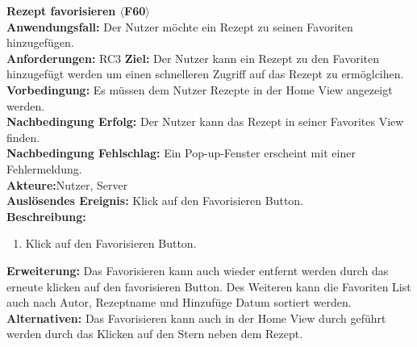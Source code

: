 \documentclass[parskip=full]{scrartcl}
\begin{document}
\textbf{Rezept favorisieren $\langle$F60$\rangle$}\\
\textbf{Anwendungsfall:} Der Nutzer möchte ein Rezept zu seinen Favoriten hinzugefügen.\\
\textbf{Anforderungen:} RC3
\textbf{Ziel:} Der Nutzer kann ein Rezept zu den Favoriten hinzugefügt werden um einen schnelleren Zugriff auf das Rezept zu ermöglcihen.\\
\textbf{Vorbedingung:} Es müssen dem Nutzer Rezepte in der Home View angezeigt werden.\\
\textbf{Nachbedingung Erfolg:} Der Nutzer kann das Rezept in seiner Favorites View finden.\\
\textbf{Nachbedingung Fehlschlag:} Ein Pop-up-Fenster erscheint mit einer Fehlermeldung.\\
\textbf{Akteure:}Nutzer, Server\\
\textbf{Auslösendes Ereignis:} Klick auf den Favorisieren Button.\\
\textbf{Beschreibung:}
\begin{enumerate}
    \item Klick auf den Favorisieren Button.
\end{enumerate}
\textbf{Erweiterung:} Das Favorisieren kann auch wieder entfernt werden durch das erneute klicken auf den favorisieren Button. Des Weiteren kann die Favoriten List auch nach Autor, Rezeptname und Hinzufüge Datum sortiert werden.
\textbf{Alternativen:} Das Favorisieren kann auch in der Home View durch geführt werden durch das Klicken auf den Stern neben dem Rezept.\\
\newpage
\end{document}
